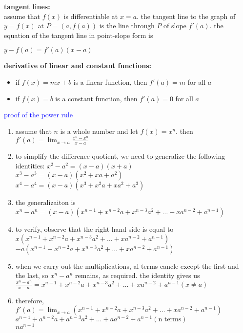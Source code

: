 \documentclass{article}
\begin{document}
\textbf{tangent lines:}\\
assume that $f(x)$ is differentiable at $x = a$. the tangent line to the graph of $y = f(x)$ at $P = (a, f(a))$ is the line through $P$ of slope $f'(a)$. the equation of the tangent line in point-slope form is
\begin{center} $y - f(a) = f'(a)(x - a)$ \end{center}

\textbf{derivative of linear and constant functions:}
	\begin{itemize}
		\item if $f(x) = mx + b$ is a linear function, then $f'(a) = m$ for all $a$
		\item if $f(x) = b$ is a constant function, then $f'(a) = 0$ for all $a$
	\end{itemize}
\newpage

\textcolor{blue}{proof of the power rule}
	\begin{enumerate}
		\item assume that $n$ is a whole number and let $f(x) = x^n$. then $f'(a) = \lim_{x \to a}\frac{x^n - x^a}{x - a}$
		\item to simplify the difference quotient, we need to generalize the following identities: $x^2 - a^2 = (x - a)(x + a)$\\ $x^3 - a^3 = (x - a)(x^2 + xa + a^2)$\\ $x^4 - a^4 = (x - a)(x^3 + x^2a + xa^2 + a^3)$
		\item the generalizaiton is $x^n - a^n = (x - a)(x^{n - 1} + x^{n - 2}a + x^{n - 3}a^2 + \ldots + xa^{n - 2} + a^{n - 1})$
		\item to verify, observe that the right-hand side is equal to\\ $x(x^{n - 1} + x^{n - 2}a + x^{n - 3}a^2 + \ldots + xa^{n - 2} + a^{n - 1})$\\$-a(x^{n - 1} + x^{n - 2}a + x^{n - 3}a^2 + \ldots + xa^{n - 2} + a^{n - 1})$
		\item when we carry out the multiplications, al terms cancle except the first and the last, so $x^n - a^n$ remains, as required. the identity gives us\\ $\frac{x^n - a^n}{x - a} = x^{n - 1} + x^{n - 2}a + x^{n - 3}a^2 + \ldots + xa^{n - 2} + a^{n - 1} (x \neq a)$
		\item therefore,\\ $f'(a) = \lim_{x \to a}(x^{n - 1} + x^{n - 2}a + x^{n - 3}a^2 + \ldots + xa^{n - 2} + a^{n - 1})$\\ $a^{n - 1} + a^{n - 2}a + a^{n - 3}a^2 + \ldots + aa^{n - 2} + a^{n - 1} (\text{n terms})$\\ $na^{n - 1}$
	\end{enumerate}
\end{document}
